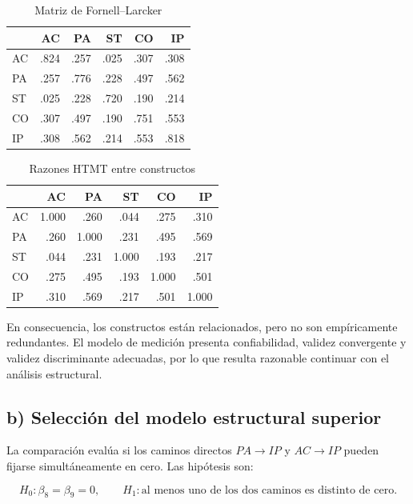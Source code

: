 \documentclass[12pt,letterpaper]{article}
\begin{document}
\begin{table}[H]
\centering
\caption{Matriz de Fornell--Larcker}
\label{tab:p3-fornell}
\begin{tabular}{lrrrrr}
\toprule
 & AC & PA & ST & CO & IP \\
\midrule
AC & .824 & .257 & .025 & .307 & .308 \\
PA & .257 & .776 & .228 & .497 & .562 \\
ST & .025 & .228 & .720 & .190 & .214 \\
CO & .307 & .497 & .190 & .751 & .553 \\
IP & .308 & .562 & .214 & .553 & .818 \\
\bottomrule
\end{tabular}
\end{table}

\begin{table}[H]
\centering
\caption{Razones HTMT entre constructos}
\label{tab:p3-htmt}
\begin{tabular}{lrrrrr}
\toprule
 & AC & PA & ST & CO & IP \\
\midrule
AC & 1.000 & .260 & .044 & .275 & .310 \\
PA & .260 & 1.000 & .231 & .495 & .569 \\
ST & .044 & .231 & 1.000 & .193 & .217 \\
CO & .275 & .495 & .193 & 1.000 & .501 \\
IP & .310 & .569 & .217 & .501 & 1.000 \\
\bottomrule
\end{tabular}
\end{table}

En consecuencia, los constructos están relacionados, pero no son empíricamente redundantes. El modelo de medición presenta confiabilidad, validez convergente y validez discriminante adecuadas, por lo que resulta razonable continuar con el análisis estructural.

\subsection{b) Selección del modelo estructural superior}

La comparación evalúa si los caminos directos $PA\rightarrow IP$ y $AC\rightarrow IP$ pueden fijarse simultáneamente en cero. Las hipótesis son:

\[
H_0:\beta_8=\beta_9=0,
\qquad
H_1:\text{al menos uno de los dos caminos es distinto de cero}.
\]

\begin{table}[H]
\centering
\caption{Comparación de los modelos estructurales en lavaan}
\end{table}
\end{document}
